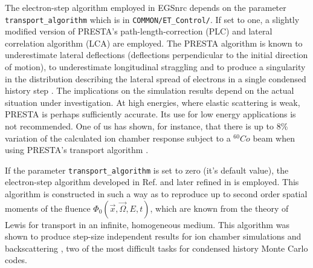 The electron-step algorithm employed in EGSnrc depends 
on the parameter {\tt trans\-port\_algo\-rithm} which 
is in {\tt COMMON/ET\_Control/}. If set 
to one, a slightly modified version of 
PRESTA's \cite{BR87} path-length-correction (PLC) 
and lateral correlation algorithm (LCA) are employed. 
The PRESTA algorithm is known to underestimate 
lateral deflections (deflections perpendicular to the 
initial direction of motion), to underestimate 
longitudinal straggling and to produce a singularity 
in the distribution describing the lateral spread of electrons 
in a single condensed history step \cite{Ka96b,KB97a}. 
The implications on the simulation results depend on 
the actual situation under investigation. At high energies, 
where elastic scattering is weak, PRESTA is perhaps sufficiently 
accurate. Its use for low energy applications is not 
recommended. One of us has shown, for instance, that 
there is up to 8\% variation of the calculated ion chamber 
response subject to a $^{60}Co$ beam when using PRESTA's 
transport algorithm \cite{Ka99b}.

If the parameter {\tt trans\-port\_algo\-rithm} is set to zero 
(it's default value), the electron-step algorithm 
developed in Ref. \cite{KB97a} and later refined in 
\cite{Ka99a} is employed. This algorithm is constructed 
in such a way as to reproduce up to second order spatial moments 
of the fluence $\Phi_0(\vec{x},\vec{\Omega},E,t)$, which 
are known from the theory of Lewis \cite{Le50} for 
transport in an infinite, homogeneous medium. This algorithm 
was shown to produce step-size independent results for 
ion chamber simulations and backscattering \cite{Ka99a,Ka99b}, two of the 
most difficult tasks for condensed history Monte Carlo codes. 


